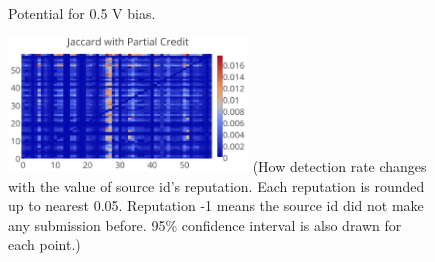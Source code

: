 \begin{figure}
\centering
{} 
 \\ 
\caption{Potential for 0.5 V bias.} 
\label{fig:EcUND} 
\end{figure} 


\begin{figure}[t!]
\begin{center}
\includegraphics[width=2.5in]{figure/jaccardPC-train}
{\footnotesize{(How detection rate changes with the value of source id's reputation. Each reputation is rounded up to nearest 0.05.
Reputation -1 means the source id did not make any submission before. 95\% confidence interval is also drawn 
for each point.)}}
\end{center}
\end{figure}